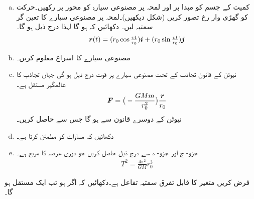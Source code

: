 \begin{enumerate}[a.]
\item
کمیت  کے جسم کو مبدا پر   اور لمحہ  پر   مصنوعی سیارہ کو  محور   پر رکھیں۔حرکت کو گھڑی وار رخ تصور کریں (شکل دیکھیں)۔لمحہ  پر مصنوعی  سیارے کا تعین گر سمتیہ  لیں۔ دکھائیں کہ  ہو گا  لہٰذا درج ذیل  ہو گا۔
\begin{align*}
{\ensuremath{{\boldsymbol{r}}}}(t)=(r_0\cos\tfrac{vt}{r_0}){\boldsymbol{i}}+(r_0\sin\tfrac{vt}{r_0}){\boldsymbol{j}}
\end{align*}
\item
مصنوعی سیارے کا اسراع معلوم کریں۔
\item
نیوٹن کے قانون تجاذب  کے تحت مصنوعی  سیارے پر قوت درج ذیل ہو گی جہاں   تجاذب کا عالمگیر مستقل ہے۔
\begin{align*}
{\ensuremath{{\boldsymbol{F}}}}=\big(-\frac{GMm}{r_0^2}\big)\frac{{{\boldsymbol{r}}}}{r_0}
\end{align*}
نیوٹن کے دوسرے قانون سے  ہو گا  جس سے  حاصل کریں۔ 
\item
دکھائیں کہ  مساوات  کو مطمئن کرتا ہے۔
\item
جزو- ج اور جزو- د سے درج ذیل حاصل کریں جو دوری عرصہ کا مربع ہے۔
\begin{align*}
T^2=\frac{4\pi^2}{GM}r_0^3
\end{align*}
\end{enumerate}
%
\begin{center}
\end{center}
فرض کریں  متغیر  کا قابل تفرق سمتیہ  تفاعل ہے۔دکھائیں کہ اگر  ہو تب  ایک مستقل ہو گا۔
\\
